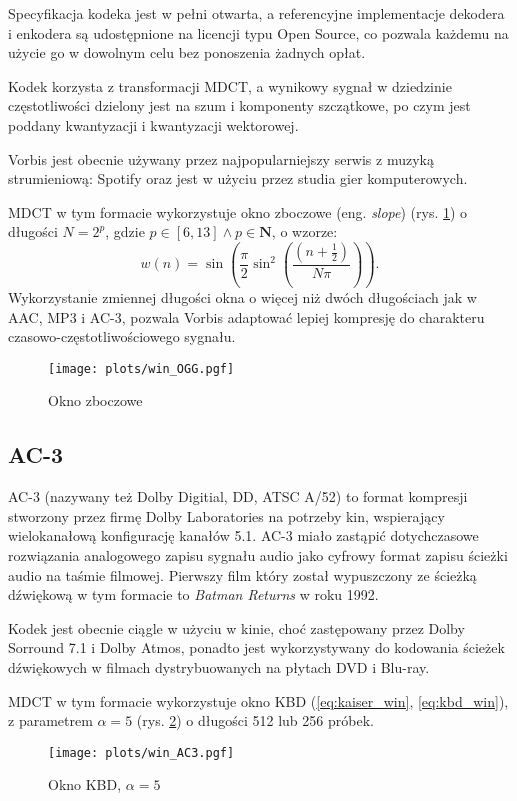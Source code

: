 \documentclass[pl,12pt]{aghdpl}
\let\Oldsubsection\subsection%
\renewcommand{\subsection}{\FloatBarrier\Oldsubsection}
\begin{document}
Specyfikacja kodeka jest w pełni otwarta, a referencyjne implementacje dekodera
i enkodera są udostępnione na licencji typu Open Source, co pozwala każdemu na
użycie go w dowolnym celu bez ponoszenia żadnych opłat.

Kodek korzysta z transformacji MDCT, a wynikowy sygnał w dziedzinie
częstotliwości dzielony jest na szum i komponenty szczątkowe, po czym jest
poddany kwantyzacji i kwantyzacji wektorowej.

Vorbis jest obecnie używany przez najpopularniejszy serwis z muzyką
strumieniową: Spotify oraz jest w użyciu przez studia gier komputerowych.

MDCT w tym formacie wykorzystuje okno zboczowe (eng. \textit{slope}) (rys.
\ref{fig:win_OGG}) o długości $N = 2^{p}$, gdzie $p \in [6,13] \land p \in \bm N$, o wzorze:
\begin{equation}\label{eq:slope_win}
  w(n) = \sin\left(\frac{\pi}{2}\sin^2\left(\frac{\left(n +
  \frac{1}{2}\right)}{N\pi}\right)\right).
\end{equation}
Wykorzystanie zmiennej długości okna o więcej niż dwóch długościach jak w AAC,
MP3 i AC-3, pozwala Vorbis adaptować lepiej kompresję do charakteru
czasowo-częstotliwościowego sygnału.

\begin{figure}[!tbh]
  \centering
  \texttt{[image: plots/win\_OGG.pgf]}
  \caption{Okno zboczowe}
  \label{fig:win_OGG}
\end{figure}

\subsection{AC-3}
AC-3 (nazywany też Dolby Digitial, DD, ATSC A/52) to format kompresji stworzony
przez firmę Dolby Laboratories na potrzeby kin, wspierający wielokanałową konfigurację
kanałów 5.1. AC-3 miało zastąpić dotychczasowe rozwiązania analogowego zapisu
sygnału audio jako cyfrowy format zapisu ścieżki audio na taśmie filmowej.
Pierwszy film który został wypuszczony ze ścieżką dźwiękową w tym formacie to
\textit{Batman Returns} w roku 1992.

Kodek jest obecnie ciągle w użyciu w kinie, choć zastępowany przez Dolby
Sorround 7.1 i Dolby Atmos, ponadto jest wykorzystywany do kodowania ścieżek
dźwiękowych w filmach dystrybuowanych na płytach DVD i Blu-ray.

MDCT w tym formacie wykorzystuje okno KBD (\ref{eq:kaiser_win},
\ref{eq:kbd_win}), z parametrem $\alpha = 5$ (rys. \ref{fig:win_AC3}) o
długości 512 lub 256 próbek.
\begin{figure}[!tbh]
  \centering
  \texttt{[image: plots/win\_AC3.pgf]}
  \caption{Okno KBD, $\alpha = 5$}
  \label{fig:win_AC3}
\end{figure}
\end{document}
